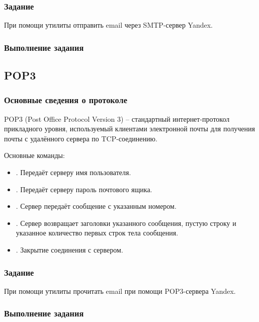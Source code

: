 \subsubsection{Задание}

При помощи утилиты  отправить email через SMTP-сервер Yandex.

\subsubsection{Выполнение задания}



\subsection{POP3}

\subsubsection{Основные сведения о протоколе}

POP3 (Post Office Protocol Version 3) -- стандартный интернет-протокол прикладного уровня, используемый клиентами электронной почты для получения почты с удалённого сервера по TCP-соединению.

Основные команды:

\begin{itemize}
	\item {}. Передаёт серверу имя пользователя.
	\item {}. Передаёт серверу пароль почтового ящика.
	\item {}. Сервер передаёт сообщение с указанным номером.
	\item {}. Сервер возвращает заголовки указанного сообщения, пустую строку и указанное количество первых строк тела сообщения.
	\item {}. Закрытие соединения с сервером. 
\end{itemize}

\subsubsection{Задание}

При помощи утилиты  прочитать email при помощи POP3-сервера Yandex.

\subsubsection{Выполнение задания}

